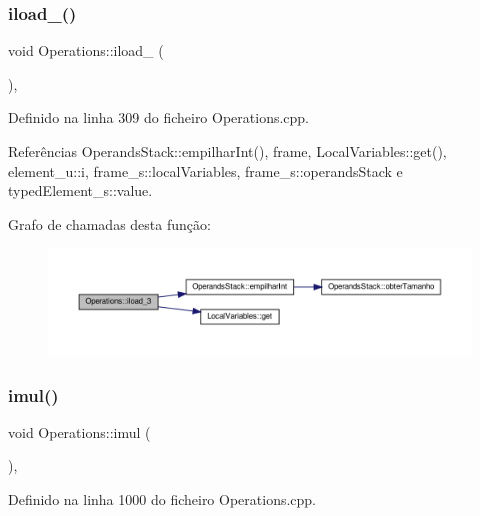 \subsubsection{\texorpdfstring{iload\+\_()}{iload\_3()}}
{\footnotesize\ttfamily void Operations\+::iload\+\_ (\begin{DoxyParamCaption}{ }\end{DoxyParamCaption})\hspace{0.3cm}{\ttfamily [static]}, {\ttfamily [private]}}



Definido na linha 309 do ficheiro Operations.\+cpp.



Referências Operands\+Stack\+::empilhar\+Int(), frame, Local\+Variables\+::get(), element\+\_\+u\+::i, frame\+\_\+s\+::local\+Variables, frame\+\_\+s\+::operands\+Stack e typed\+Element\+\_\+s\+::value.

Grafo de chamadas desta função\+:\nopagebreak
\begin{figure}[H]
\begin{center}
\leavevmode
\includegraphics[width=350pt]{classOperations_a3f645534291129289ee71c708dbe633c_cgraph}
\end{center}
\end{figure}
\mbox{\label{classOperations_a01b2ffdd380327b31b03657eb99b8a81}} 
\subsubsection{\texorpdfstring{imul()}{imul()}}
{\footnotesize\ttfamily void Operations\+::imul (\begin{DoxyParamCaption}{ }\end{DoxyParamCaption})\hspace{0.3cm}{\ttfamily [static]}, {\ttfamily [private]}}



Definido na linha 1000 do ficheiro Operations.\+cpp.



